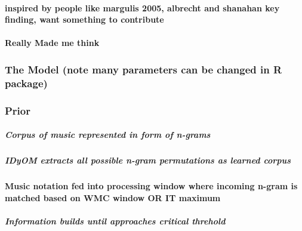 \documentclass[]{book}
\let\oldparagraph\paragraph
\renewcommand{\paragraph}[1]{\oldparagraph{#1}\mbox{}}
\let\oldsubparagraph\subparagraph
\renewcommand{\subparagraph}[1]{\oldsubparagraph{#1}\mbox{}}
\theoremstyle{definition}
\theoremstyle{definition}
\theoremstyle{definition}
\theoremstyle{remark}
\begin{document}
\hypertarget{inspired-by-people-like-margulis-2005-albrecht-and-shanahan-key-finding-want-something-to-contribute}{%
\paragraph{inspired by people like margulis 2005, albrecht and shanahan
key finding, want something to
contribute}\label{inspired-by-people-like-margulis-2005-albrecht-and-shanahan-key-finding-want-something-to-contribute}}

\hypertarget{really-made-me-think}{%
\paragraph{Really Made me think}\label{really-made-me-think}}

\hypertarget{the-model-note-many-parameters-can-be-changed-in-r-package}{%
\subsubsection{The Model (note many parameters can be changed in R
package)}\label{the-model-note-many-parameters-can-be-changed-in-r-package}}

\hypertarget{prior}{%
\subsubsection{Prior}\label{prior}}

\hypertarget{corpus-of-music-represented-in-form-of-n-grams}{%
\subparagraph{Corpus of music represented in form of
n-grams}\label{corpus-of-music-represented-in-form-of-n-grams}}

\hypertarget{idyom-extracts-all-possible-n-gram-permutations-as-learned-corpus}{%
\subparagraph{IDyOM extracts all possible n-gram permutations as learned
corpus}\label{idyom-extracts-all-possible-n-gram-permutations-as-learned-corpus}}

\hypertarget{music-notation-fed-into-processing-window-where-incoming-n-gram-is-matched-based-on-wmc-window-or-it-maximum}{%
\paragraph{Music notation fed into processing window where incoming
n-gram is matched based on WMC window OR IT
maximum}\label{music-notation-fed-into-processing-window-where-incoming-n-gram-is-matched-based-on-wmc-window-or-it-maximum}}

\hypertarget{information-builds-until-approaches-critical-threhold}{%
\subparagraph{Information builds until approaches critical
threhold}\label{information-builds-until-approaches-critical-threhold}}
\end{document}
